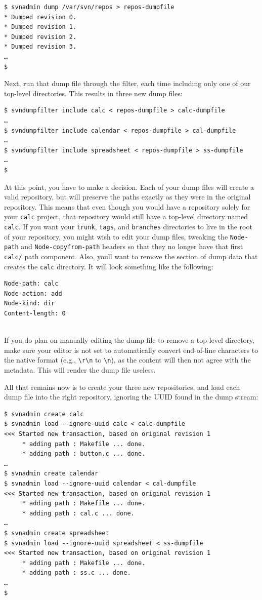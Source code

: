 \begin{verbatim}
$ svnadmin dump /var/svn/repos > repos-dumpfile
* Dumped revision 0.
* Dumped revision 1.
* Dumped revision 2.
* Dumped revision 3.
…
$
\end{verbatim}

Next, run that dump file through the filter, each time including only
one of our top-level directories. This results in three new dump files:

\begin{verbatim}
$ svndumpfilter include calc < repos-dumpfile > calc-dumpfile
…
$ svndumpfilter include calendar < repos-dumpfile > cal-dumpfile
…
$ svndumpfilter include spreadsheet < repos-dumpfile > ss-dumpfile
…
$
\end{verbatim}

At this point, you have to make a decision. Each of your dump files will
create a valid repository, but will preserve the paths exactly as they
were in the original repository. This means that even though you would
have a repository solely for your \texttt{calc} project, that repository
would still have a top-level directory named \texttt{calc}. If you want
your \texttt{trunk}, \texttt{tags}, and \texttt{branches} directories to
live in the root of your repository, you might wish to edit your dump
files, tweaking the \texttt{Node-path} and \texttt{Node-copyfrom-path}
headers so that they no longer have that first \texttt{calc/} path
component. Also, you\textquotesingle ll want to remove the section of
dump data that creates the \texttt{calc} directory. It will look
something like the following:

\begin{verbatim}
Node-path: calc
Node-action: add
Node-kind: dir
Content-length: 0
  
\end{verbatim}

If you do plan on manually editing the dump file to remove a top-level
directory, make sure your editor is not set to automatically convert
end-of-line characters to the native format (e.g.,
\texttt{\textbackslash{}r\textbackslash{}n} to
\texttt{\textbackslash{}n}), as the content will then not agree with the
metadata. This will render the dump file useless.

All that remains now is to create your three new repositories, and load
each dump file into the right repository, ignoring the UUID found in the
dump stream:

\begin{verbatim}
$ svnadmin create calc
$ svnadmin load --ignore-uuid calc < calc-dumpfile
<<< Started new transaction, based on original revision 1
     * adding path : Makefile ... done.
     * adding path : button.c ... done.
…
$ svnadmin create calendar
$ svnadmin load --ignore-uuid calendar < cal-dumpfile
<<< Started new transaction, based on original revision 1
     * adding path : Makefile ... done.
     * adding path : cal.c ... done.
…
$ svnadmin create spreadsheet
$ svnadmin load --ignore-uuid spreadsheet < ss-dumpfile
<<< Started new transaction, based on original revision 1
     * adding path : Makefile ... done.
     * adding path : ss.c ... done.
…
$
\end{verbatim}

